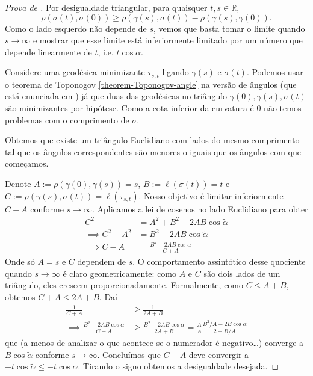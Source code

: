 \begin{proof}[Prova de \cite{Cheeger-Ebin}]
Por desigualdade triangular, para quaisquer
$t,s \in \mathbb{R}$,
$$
\rho(\sigma(t),\sigma(0)) \geq
\rho(\gamma(s),\sigma(t))-\rho(\gamma(s),
\gamma(0)).
$$
Como o lado esquerdo não depende de $s$,
vemos que basta tomar o limite quando
$s\to \infty$ e mostrar que esse limite está
inferiormente limitado por um
número que depende linearmente de $t$, i.e.
$t \cos\alpha$.

Considere uma geodésica minimizante
$\tau_{s,t}$ ligando $\gamma(s)$ e
$\sigma(t)$. Podemos usar o teorema de
Toponogov \ref{theorem-Toponogov-angle}
na versão de ângulos (que está enunciada em
\cite{Cheeger-Ebin}) já que duas das
geodésicas no triângulo
$\gamma(0),\gamma(s),\sigma(t)$ são
minimizantes por
hipótese. Como a cota inferior da curvatura é
0 não temos problemas com o
comprimento de $\sigma$.

Obtemos que existe um triângulo Euclidiano
com lados do mesmo comprimento tal
que os ângulos correspondentes são menores o
iguais que os ângulos com que
começamos.

Denote $A:=\rho(\gamma(0),\gamma(s))=s$,
$B:=\ell(\sigma(t))=t$ e
 $C:=\rho(\gamma(s),\sigma(t))=\ell(\tau_{s,
 t})$.
Nosso objetivo é limitar inferiormente $C-A$
conforme  $s \to \infty$.
 Aplicamos a lei de cosenos no lado
 Euclidiano para obter
$$
\begin{aligned}
C^2&=A^2+B^2-2AB\cos\tilde{\alpha}\\
\implies C^2-A^2&=B^2-2AB\cos\tilde{\alpha}\\
\implies
C-A&=\frac{B^2-2AB\cos\tilde{\alpha}}{C+A}
\end{aligned}
$$
Onde só $A=s$ e $C$ dependem de $s$. O
comportamento assintótico desse quociente
quando $s \to \infty$ é claro
geometricamente: como $A$ e $C$ são dois
lados de
um triângulo, eles crescem
proporcionadamente. Formalmente, como $C \leq
A+B$,
obtemos $C+A \leq 2A+B$. Daí
$$
\begin{aligned}
\frac{1}{C+A}&\geq \frac{1}{2A+B}\\
\implies \frac{B^2-2AB\cos
\tilde{\alpha}}{C+A}&\geq
 \frac{B^2-2AB \cos \tilde{\alpha}}{2A+B}
=\frac{A}{A}\frac{B^2/A-2B\cos
\tilde{\alpha}}{2+B/A}
\end{aligned}
$$
que (a menos de analizar o que acontece se o
numerador é negativo…)
 converge a $B\cos \tilde{\alpha}$ conforme
 $s \to \infty$.
 Concluímos que $C-A$ deve
convergir a
$-t\cos\tilde{\alpha}\leq-t\cos\alpha$.
Tirando o signo obtemos a
desigualdade desejada.
\end{proof}

\clearpage




